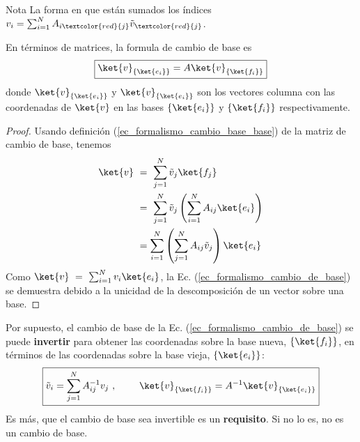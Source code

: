 \documentclass[a4paper,11pt]{book} %
\numberwithin{equation}{chapter}
\def\lp{\left(}
\def\rp{\right)}
\begin{document}
	\begin{mybox_blue}{Nota}
	La forma en que están sumados los índices $v_i = \sum_{i=1}^N A_{i\textcolor{red}{j}} \tilde{v}_{\textcolor{red}{j}} $.
	\end{mybox_blue}
En términos de matrices, la formula de cambio de base es
	\begin{equation}
	\boxed{\ket{v}_{\{\ket{e_i}\}} = A \ket{v}_{\{\ket{f_i}\}}}
	\end{equation}
	donde $\ket{v}_{\{\ket{e_i}\}}$ y $\ket{v}_{\{\ket{e_i}\}}$ son los vectores columna con las coordenadas de $\ket{v}$  en las bases $\{\ket{e_i}\}$ y $\{\ket{f_i}\}$ respectivamente. 
	\begin{proof}
	Usando definición (\ref{ec_formalismo_cambio_base_base}) de la matriz de cambio de base, tenemos
	\begin{align*}
	\ket{v} ~&= ~ \sum_{j=1}^N \tilde{v}_j \ket{f_j} \\
	& = ~ \sum_{j=1}^N \tilde{v}_j \lp \sum_{i=1}^N A_{ i j} \ket{e_i} \rp \\
	& =   \sum_{i=1}^N \lp  \sum_{j=1}^N A_{ i j} \tilde{v}_j \rp \ket{e_i} 
	\end{align*}
	Como $\ket{v} ~=~ \sum_{i=1}^N v_i \ket{e_i}$, la Ec. (\ref{ec_formalismo_cambio_de_base}) se demuestra debido a la unicidad de la descomposición de un vector sobre una base.
	\end{proof}
	
	Por supuesto, el cambio de base de la Ec. (\ref{ec_formalismo_cambio_de_base}) se puede \textbf{invertir} para 
	obtener las coordenadas sobre la base nueva, $\{\ket{f_i}\}$, en términos de las coordenadas sobre la base vieja,  $\{\ket{e_i}\}$:
	\begin{equation} \label{ec_formalismo_cambio_de_base_inv}
	\boxed{\tilde{v}_i = \sum_{j=1}^N A^{-1}_{ij} v_j ~, ~~~~~~~ 
	\ket{v}_{\{\ket{f_i}\}} = A^{-1} \ket{v}_{\{\ket{e_i}\}}}
	\end{equation}
	Es más, que el cambio de base sea invertible es un \textbf{requisito}. Si no lo es, no es un cambio de base.
	
\end{document}
